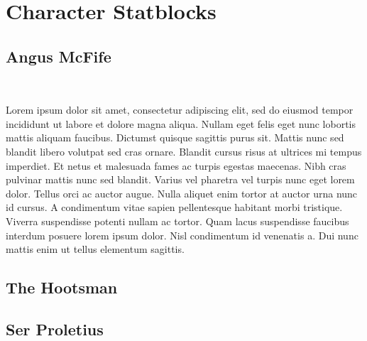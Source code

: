 \onecolumn
\chapter*{Character Statblocks}
\section*{Angus McFife}\label{char:AngusMcFife}%
%
\vspace*{-2.4\fontdimen6\font}\hfill\\\begin{multicols}{2}%
	{\noindent\entryfont Lorem ipsum dolor sit amet, consectetur adipiscing elit, sed do eiusmod tempor incididunt ut labore et dolore magna aliqua. Nullam eget felis eget nunc lobortis mattis aliquam faucibus. Dictumst quisque sagittis purus sit. Mattis nunc sed blandit libero volutpat sed cras ornare. Blandit cursus risus at ultrices mi tempus imperdiet. Et netus et malesuada fames ac turpis egestas maecenas. Nibh cras pulvinar mattis nunc sed blandit. Varius vel pharetra vel turpis nunc eget lorem dolor. Tellus orci ac auctor augue. Nulla aliquet enim tortor at auctor urna nunc id cursus. A condimentum vitae sapien pellentesque habitant morbi tristique. Viverra suspendisse potenti nullam ac tortor. Quam lacus suspendisse faucibus interdum posuere lorem ipsum dolor. Nisl condimentum id venenatis a. Dui nunc mattis enim ut tellus elementum sagittis.}
\end{multicols}%
%
\clearpage
\section*{The Hootsman}\label{char:Hootsman}%
%
\clearpage
\section*{Ser Proletius}\label{char:SerProletius}%
%
\clearpage
